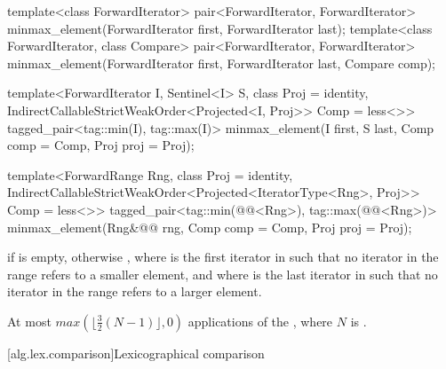 %
\begin{removedblock}
\begin{itemdecl}
template<class ForwardIterator>
  pair<ForwardIterator, ForwardIterator>
    minmax_element(ForwardIterator first, ForwardIterator last);
template<class ForwardIterator, class Compare>
  pair<ForwardIterator, ForwardIterator>
    minmax_element(ForwardIterator first, ForwardIterator last, Compare comp);
\end{itemdecl}
\end{removedblock}
\begin{addedblock}
\begin{itemdecl}
template<ForwardIterator I, Sentinel<I> S, class Proj = identity,
    IndirectCallableStrictWeakOrder<Projected<I, Proj>> Comp = less<>>
  tagged_pair<tag::min(I), tag::max(I)>
    minmax_element(I first, S last, Comp comp = Comp{}, Proj proj = Proj{});

template<ForwardRange Rng, class Proj = identity,
    IndirectCallableStrictWeakOrder<Projected<IteratorType<Rng>, Proj>> Comp = less<>>
  tagged_pair<tag::min(@@<Rng>),
              tag::max(@@<Rng>)>
    minmax_element(Rng&@\newtxt{\&}@ rng, Comp comp = Comp{}, Proj proj = Proj{});
\end{itemdecl}
\end{addedblock}

\begin{itemdescr}
\pnum
\returns
{} if  is empty, otherwise
, where  is
the first iterator in  such that no iterator in the range refers to a smaller
element, and where  is the last iterator in  such that no iterator
in the range refers to a larger element.

\pnum
\complexity
At most
$max(\lfloor{\frac{3}{2}} (N-1)\rfloor, 0)$
applications of the ,
where $N$ is .
\end{itemdescr}

[alg.lex.comparison]{Lexicographical comparison}

